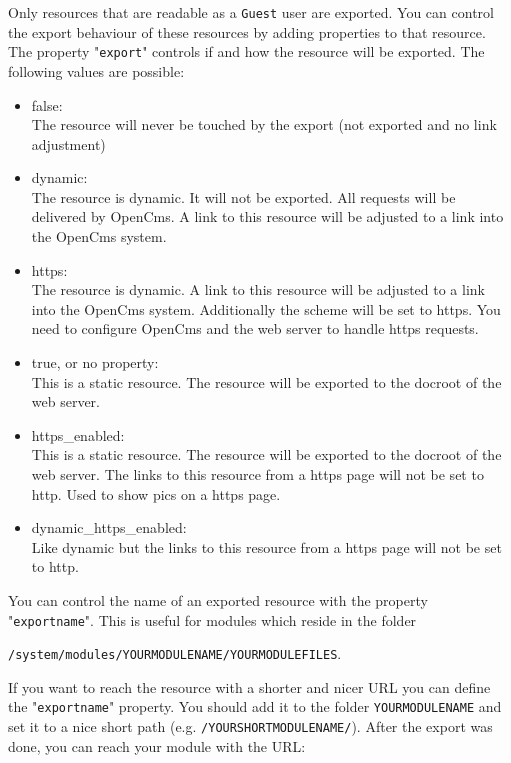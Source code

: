 Only resources that are readable as a \texttt{Guest} user are exported. You can control the export behaviour of these resources by adding properties to that resource. The property "\texttt{export}" controls if and how the resource will be exported. The following values are possible:

\begin{itemize}
\item false:\\
The resource will never be touched by the export (not exported and no link adjustment)

\item dynamic:\\
The resource is dynamic. It will not be exported. All requests will be delivered by OpenCms. A link to this resource will be adjusted to a link into the OpenCms system.

\item https:\\
The resource is dynamic. A link to this resource will be adjusted to a link into the OpenCms system. Additionally the scheme will be set to https. You need to configure OpenCms and the web server to handle https requests.

\item true, or no property:\\
This is a static resource. The resource will be exported to the docroot of the web server.

\item https\_enabled:\\
This is a static resource. The resource will be exported to the docroot of the web server. The links to this resource from a https page will not be set to http. Used to show pics on a https page.

\item dynamic\_https\_enabled:\\
Like dynamic but the links to this resource from a https page will not be set to http. 
\end{itemize}

You can control the name of an exported resource with the property "\texttt{exportname}". This is useful for modules which reside in the folder 

\texttt{/system/modules/YOURMODULENAME/YOURMODULEFILES}. 

If you want to reach the resource with a shorter and nicer URL you can define the "\texttt{exportname}" property. You should add it to the folder \texttt{YOURMODULENAME} and set it to a nice short path (e.g. \texttt{/YOURSHORTMODULENAME/}). After the export was done, you can reach your module with the URL:

